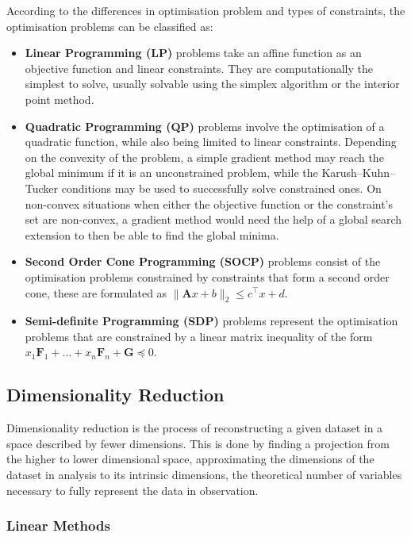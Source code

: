     According to the differences in optimisation problem and types of constraints, the optimisation problems can be classified as:
    \begin{itemize}
        \item \textbf{Linear Programming (LP)} problems take an affine function as an objective function and linear constraints. They are computationally the simplest to solve, usually solvable using the simplex algorithm or the interior point method.
        \item \textbf{Quadratic Programming (QP)} problems involve the optimisation of a quadratic function, while also being limited to linear constraints. Depending on the convexity of the problem, a simple gradient method may reach the global minimum if it is an unconstrained problem, while the Karush–Kuhn–Tucker conditions may be used to successfully solve constrained ones. On non-convex situations when either the objective function or the constraint's set are non-convex, a gradient method would need the help of a global search extension to then be able to find the global minima.
        
        \item \textbf{Second Order Cone Programming (SOCP)} problems consist of the optimisation problems constrained by constraints that form a second order cone, these are formulated as $\| \bm{A}x+b \|_2 \le c^\top x +d$.
        
        \item \textbf{Semi-definite Programming (SDP)} problems represent the optimisation problems that are constrained by a linear matrix inequality of the form $x_1\bm{F}_1 + \ldots + x_n\bm{F}_n + \bm{G} \preceq 0$.
    \end{itemize}

    \subsection{Dimensionality Reduction}
    Dimensionality reduction is the process of reconstructing a given dataset in a space described by fewer dimensions. This is done by finding a projection from the higher to lower dimensional space, approximating the dimensions of the dataset in analysis to its intrinsic dimensions, the theoretical number of variables necessary to fully represent the data in observation.
    
    \subsubsection{Linear Methods}
    

